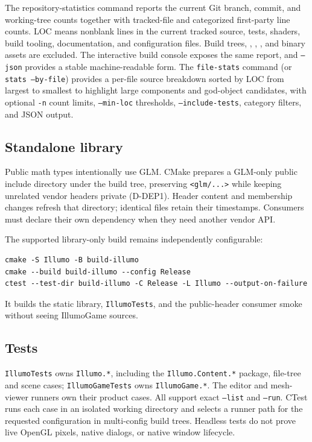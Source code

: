 The repository-statistics command reports the current Git branch, commit, and
working-tree counts together with tracked-file and categorized first-party line
counts. LOC means nonblank lines in the current tracked source, tests, shaders,
build tooling, documentation, and configuration files. Build trees,
, , , and
binary assets are excluded. The interactive build console exposes the same
report, and \texttt{--json} provides a stable machine-readable form.
The \texttt{file-stats} command (or \texttt{stats --by-file}) provides a per-file
source breakdown sorted by LOC from largest to smallest to highlight large
components and god-object candidates, with optional \texttt{-n} count limits,
\texttt{--min-loc} thresholds, \texttt{--include-tests}, category filters, and JSON output.

\subsection{Standalone library}
Public math types intentionally use GLM. CMake prepares a GLM-only public include
directory under the build tree, preserving \texttt{<glm/...>} while keeping
unrelated vendor headers private (D-DEP1). Header content and membership changes
refresh that directory; identical files retain their timestamps. Consumers must
declare their own dependency when they need another vendor API.

The supported library-only build remains independently configurable:
\begin{lstlisting}[language={}]
cmake -S Illumo -B build-illumo
cmake --build build-illumo --config Release
ctest --test-dir build-illumo -C Release -L Illumo --output-on-failure
\end{lstlisting}
It builds the static library, \texttt{IllumoTests}, and the public-header
consumer smoke without seeing IllumoGame sources.

\subsection{Tests}
\texttt{IllumoTests} owns \texttt{Illumo.*}, including the
\texttt{Illumo.Content.*} package, file-tree and scene cases;
\texttt{IllumoGameTests} owns
\texttt{IllumoGame.*}. The editor and mesh-viewer runners own their product
cases. All support exact \texttt{--list} and \texttt{--run}.
CTest runs each case in an isolated working directory and selects a runner path
for the requested configuration in multi-config build trees. Headless tests do
not prove live OpenGL pixels, native dialogs, or native window lifecycle.

